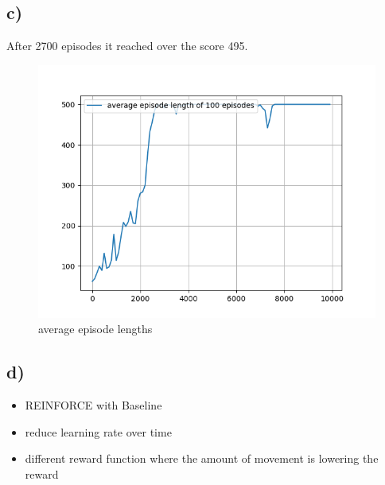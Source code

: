 \documentclass[a4paper]{article}
\begin{document}
\subsection*{c)}

After 2700 episodes it reached over the score 495.
\begin{figure}[!ht]
	\centering
	\includegraphics[width=0.7\linewidth]{length}
	\caption{average episode lengths}
	\label{fig:length}
\end{figure}

\subsection*{d)}

\begin{itemize}
	\item REINFORCE with Baseline
	\item reduce learning rate over time
	\item different reward function where the amount of movement is lowering the reward
\end{itemize}
\end{document}
